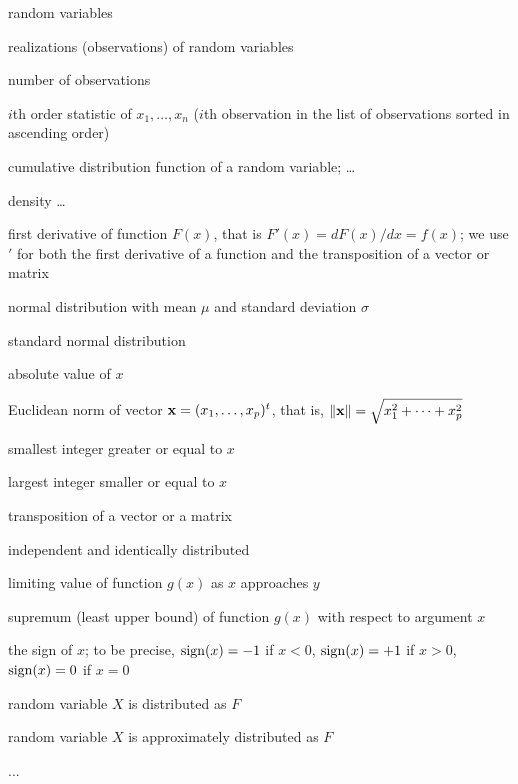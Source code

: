 \begin{description}[leftmargin=6em,style=nextline]
    \item[$X, Y, Z, \dots$]
        random variables
    \item[$x_i, y_i, z_i, \dots$]
        realizations (observations) of random variables
    \item[$n$]
        number of observations
    \item[$x_{(i)}$]
        $i$th order statistic of $x_1, \dots, x_n$ ($i$th observation in the list of observations sorted in ascending order)
    \item[$F(x)$]
        cumulative distribution function of a random variable; \dots
    \item[$f(x)$]
        density \dots
    \item[$F'(x)$]
        first derivative of function $F(x)$, that is $F'(x) = dF(x)/dx = f(x)$;
        we use $'$ for both the first derivative of a function and the
        transposition of a vector or matrix
    \item[$\mathcal{N}(\mu, \sigma)$]
        normal distribution with mean $\mu$ and standard deviation $\sigma$
    \item[$\mathcal{N}(0, 1)$]
        standard normal distribution
    \item[$|x|$]
        absolute value of $x$
    \item[$\Vert\stvec{x}\Vert$]
        Euclidean norm of vector $\mathbf x = (x_1, \dots, x_p)^t$, that is, $\Vert\mathbf x\Vert = \sqrt{x_1^2 + \dots + x_p^2}$
    \item[$\lceil x \rceil$]
        smallest integer greater or equal to $x$
    \item[$\lfloor x \rfloor$] 
        largest integer smaller or equal to $x$
    \item[$\stvec{x}^t$, $\stmat{X}^t$]
        transposition of a vector or a matrix
    \item[\normalfont i.i.d.]
        independent and identically distributed
    \item[$\displaystyle\lim_{x\rightarrow y} g(x)$]
        limiting value of function $g(x)$ as $x$ approaches $y$
    \item[$\displaystyle\sup_x g(x)$]
        supremum (least upper bound) of function $g(x)$ with respect 
        to argument $x$
    \item[$\sign(x)$]
        the sign of $x$; to be precise, $\operatorname{sign}(x)=-1$ if $x<0$, $\operatorname{sign}(x)=+1$ if $x>0$, $\operatorname{sign}(x)=0$ if $x=0$
    \item[$X\sim F$]
        random variable $X$ is distributed as $F$
    \item[$X\approx F$]
        random variable $X$ is approximately distributed as $F$
    \item[\alert{...}]
        \alert{...}
\end{description}




\endinput
